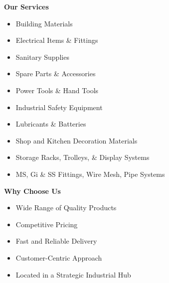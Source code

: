 \documentclass[11pt]{article}
\begin{document}
\begin{minipage}[t]{0.5\textwidth}

    \vspace{0.6em}

     \begin{adjustwidth}{2em}{0em} %
    \textbf{\Huge Our Services} \\
    \vspace{0.3em}
    \footnotesize
    \begin{itemize}[leftmargin=*, itemsep=0.2em]
    \Large
      \item Building Materials
      \item Electrical Items \& Fittings
      \item Sanitary Supplies
      \item Spare Parts \& Accessories
      \item Power Tools \& Hand Tools
      \item Industrial Safety Equipment
      \item Lubricants \& Batteries
      \item Shop and Kitchen Decoration Materials
      \item Storage Racks, Trolleys, \& Display Systems
      \item MS, Gi \& SS Fittings, Wire Mesh, Pipe Systems
    \end{itemize}
    \end{adjustwidth}

    \vspace{1em}

     \begin{adjustwidth}{2em}{0em} %
    \textbf{\Huge Why Choose Us} \\
    \vspace{0em}
    \Large
   \begin{itemize}[leftmargin=*, label=\checkmark, itemsep=0.2em]
      \item Wide Range of Quality Products
      \item Competitive Pricing
      \item Fast and Reliable Delivery
      \item Customer-Centric Approach
      \item Located in a Strategic Industrial Hub
    \end{itemize}
    \end{adjustwidth}
\end{minipage}
\end{document}
